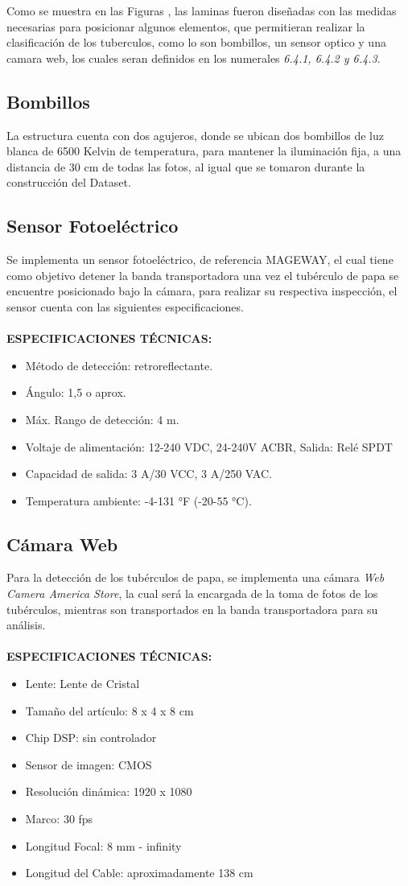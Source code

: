 Como se muestra en las Figuras , las laminas fueron diseñadas con las medidas necesarias para posicionar algunos elementos, que permitieran realizar la clasificación de los tuberculos, como lo son bombillos, un sensor optico y una camara web, los cuales seran definidos en los numerales \textit{6.4.1, 6.4.2 y 6.4.3}.

\subsection{Bombillos}
La estructura cuenta con dos agujeros, donde se ubican dos bombillos de luz blanca de 6500 Kelvin de temperatura, para mantener la iluminación fija, a una distancia de 30 cm de todas las fotos, al igual que se tomaron durante la construcción del Dataset.
\subsection{Sensor Fotoeléctrico}
Se implementa un sensor fotoeléctrico, de referencia MAGEWAY, el cual tiene como objetivo detener la banda transportadora una vez el tubérculo de papa se encuentre posicionado bajo la cámara, para realizar su respectiva inspección, el sensor cuenta con las siguientes especificaciones.
\\
\\
\textbf{ESPECIFICACIONES TÉCNICAS:}
\begin{itemize}
	\item Método de detección: retroreflectante.
	\item Ángulo: 1,5 o aprox.
	\item Máx. Rango de detección: 4 m.
	\item Voltaje de alimentación: 12-240 VDC, 24-240V ACBR, Salida: Relé SPDT
	\item Capacidad de salida: 3 A/30 VCC, 3 A/250 VAC.
	\item Temperatura ambiente: -4-131 °F (-20-55 °C).
\end{itemize}

\subsection{Cámara Web}
Para la detección de los tubérculos de papa, se implementa una cámara \textit{Web Camera America Store}, la cual será la encargada de la toma de fotos de los tubérculos, mientras son transportados en la banda transportadora para su análisis.
\\
\\
\textbf{ESPECIFICACIONES TÉCNICAS:}
\begin{itemize}
	\item Lente: Lente de Cristal
	\item Tamaño del artículo: 8 x 4 x 8 cm
	\item Chip DSP: sin controlador
	\item Sensor de imagen: CMOS
	\item Resolución dinámica: 1920 x 1080
	\item Marco: 30 fps
	\item Longitud Focal: 8 mm - infinity
	\item Longitud del Cable: aproximadamente 138 cm
\end{itemize}

